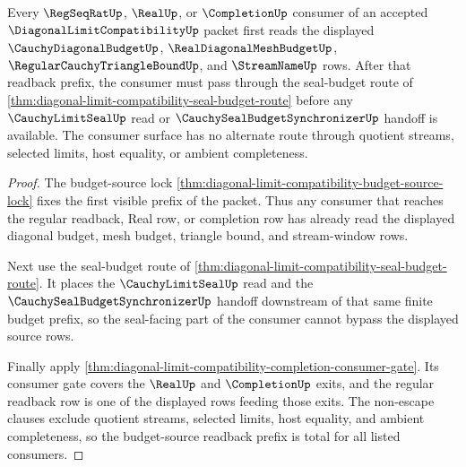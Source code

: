 \begin{theorem}
\label{thm:diagonal-limit-compatibility-budget-source-readback-totality}
Every $\RegSeqRatUp$, $\RealUp$, or $\CompletionUp$ consumer of an accepted $\DiagonalLimitCompatibilityUp$ packet first reads the displayed $\CauchyDiagonalBudgetUp$, $\RealDiagonalMeshBudgetUp$, $\RegularCauchyTriangleBoundUp$, and $\StreamNameUp$ rows. After that readback prefix, the consumer must pass through the seal-budget route of \autoref{thm:diagonal-limit-compatibility-seal-budget-route} before any $\CauchyLimitSealUp$ read or $\CauchySealBudgetSynchronizerUp$ handoff is available. The consumer surface has no alternate route through quotient streams, selected limits, host equality, or ambient completeness.
\end{theorem}
\begin{proof}
The budget-source lock \autoref{thm:diagonal-limit-compatibility-budget-source-lock} fixes the first visible prefix of the packet. Thus any consumer that reaches the regular readback, Real row, or completion row has already read the displayed diagonal budget, mesh budget, triangle bound, and stream-window rows.

Next use the seal-budget route of \autoref{thm:diagonal-limit-compatibility-seal-budget-route}. It places the $\CauchyLimitSealUp$ read and the $\CauchySealBudgetSynchronizerUp$ handoff downstream of that same finite budget prefix, so the seal-facing part of the consumer cannot bypass the displayed source rows.

Finally apply \autoref{thm:diagonal-limit-compatibility-completion-consumer-gate}. Its consumer gate covers the $\RealUp$ and $\CompletionUp$ exits, and the regular readback row is one of the displayed rows feeding those exits. The non-escape clauses exclude quotient streams, selected limits, host equality, and ambient completeness, so the budget-source readback prefix is total for all listed consumers.
\end{proof}

